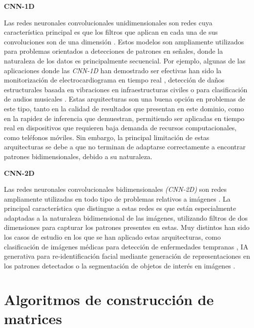 \textbf{CNN-1D}

Las redes neuronales convolucionales unidimensionales son redes cuya característica principal es que los filtros que aplican en cada una de sus convoluciones son de una dimensión \cite{CNN1D}. Estos modelos son ampliamente utilizados para problemas orientados a detecciones de patrones en señales, donde la naturaleza de los datos es principalmente secuencial. Por ejemplo, algunas de las aplicaciones donde las \textit{CNN-1D} han demostrado ser efectivas han sido la monitorización de electrocardiograma en tiempo real \cite{Kiranyaz2017tt}, detección de daños estructurales basada en vibraciones en infraestructuras civiles \cite{khodabandehlou2019vibration} o para clasificación de audios musicales \cite{allamy20211d}. Estas arquitecturas son una buena opción en problemas de este tipo, tanto en la calidad de resultados que presentan en este dominio, como en la rapidez de inferencia que demuestran, permitiendo ser aplicadas en tiempo real en dispositivos que requieren baja demanda de recursos computacionales, como teléfonos móviles. Sin embargo, la principal limitación de estas arquitecturas se debe a que no terminan de adaptarse correctamente a encontrar patrones bidimensionales, debido a su naturaleza.

\textbf{CNN-2D}

Las redes neuronales convolucionales bidimensionales \textit{(CNN-2D)} son redes ampliamente utilizadas en todo tipo de problemas relativos a imágenes \cite{9451544}. La principal característica que distingue a estas redes es que están especialmente adaptadas a la naturaleza bidimensional de las imágenes, utilizando filtros de dos dimensiones para capturar los patrones presentes en estas. Muy distintos han sido los casos de estudio en los que se han aplicado estas arquitecturas, como clasificación de imágenes médicas para detección de enfermedades tempranas \cite{7064414}, IA generativa para re-identificación facial \cite{6909616} mediante generación de representaciones en los patrones detectados o la segmentación de objetos de interés en imágenes \cite{long2015fully}.

\section{Algoritmos de construcción de matrices}
\label{SOAT_MATRIX_ALGORITHM_CONSTRUCTION}


